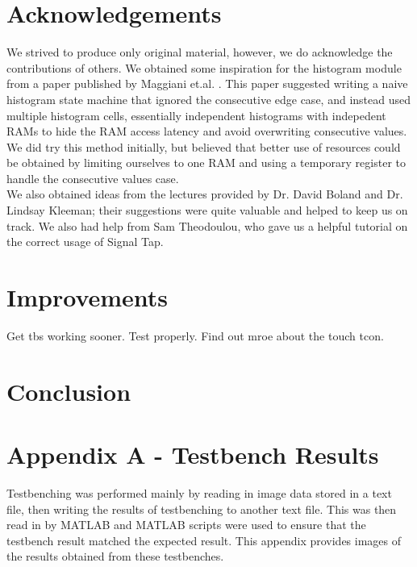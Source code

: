 \documentclass[12pt]{article}
\begin{document}
  \section{Acknowledgements}
  We strived to produce only original material, however, we do acknowledge the contributions of others. We obtained some inspiration for the histogram module from a paper published by Maggiani et.al. \cite{histogram}. This paper suggested writing a naive histogram state machine that ignored the consecutive edge case, and instead used multiple histogram cells, essentially independent histograms with indepedent RAMs to hide the RAM access latency and avoid overwriting consecutive values. We did try this method initially, but believed that better use of resources could be obtained by limiting ourselves to one RAM and using a temporary register to handle the consecutive values case. \\
  
  We also obtained ideas from the lectures provided by Dr. David Boland and Dr. Lindsay Kleeman; their suggestions were quite valuable and helped to keep us on track. We also had help from Sam Theodoulou, who gave us a helpful tutorial on the correct usage of Signal Tap.
  
  \section{Improvements}
  Get tbs working sooner. Test properly. Find out mroe about the touch tcon. 
  
  \section{Conclusion}
  
  
  
  \newpage
  \section{Appendix A - Testbench Results}
  Testbenching was performed mainly by reading in image data stored in a text file, then writing the results of testbenching to another text file. This was then read in by MATLAB and MATLAB scripts were used to ensure that the testbench result matched the expected result. This appendix provides images of the results obtained from these testbenches.
\end{document}
